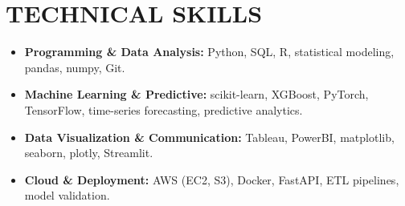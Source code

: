 \documentclass[a4paper,9pt]{extarticle}
\begin{document}
\section*{TECHNICAL SKILLS}

\begin{itemize}[leftmargin=0.5cm, label={}]
\item \textbf{Programming \& Data Analysis:} Python, SQL, R, statistical modeling, pandas, numpy, Git. \\

\item \textbf{Machine Learning \& Predictive:} scikit-learn, XGBoost, PyTorch, TensorFlow, time-series forecasting, predictive analytics. \\

\item \textbf{Data Visualization \& Communication:} Tableau, PowerBI, matplotlib, seaborn, plotly, Streamlit. \\

\item \textbf{Cloud \& Deployment:} AWS (EC2, S3), Docker, FastAPI, ETL pipelines, model validation. \\
\end{itemize}
\end{document}
